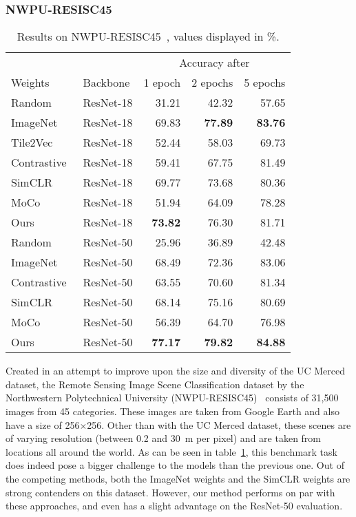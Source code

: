 \documentclass[journal]{IEEEtran}
\begin{document}
\subsubsection{NWPU-RESISC45}
\begin{table}
  \center
  \caption{
    Results on NWPU-RESISC45~\cite{resisc45}, values displayed in \%.
  }\label{table:resisc45}
  \begin{tabular}{llrrr}
    \toprule
    &&\multicolumn{3}{c}{Accuracy after}\\
    Weights&Backbone&1 epoch&2 epochs&5 epochs\\
    \midrule
    Random                        & ResNet-18 & 31.21 & 42.32 & 57.65 \\
    ImageNet                      & ResNet-18 & 69.83 & \textbf{77.89} & \textbf{83.76} \\
    Tile2Vec~\cite{tile2vec}      & ResNet-18 & 52.44 & 58.03 & 69.73 \\
    Contrastive~\cite{simclr}     & ResNet-18 & 59.41 & 67.75 & 81.49 \\
    SimCLR~\cite{simclr}          & ResNet-18 & 69.77 & 73.68 & 80.36 \\
    MoCo~\cite{he_momentum_2020}  & ResNet-18 & 51.94 & 64.09 & 78.28 \\
    Ours                          & ResNet-18 & \textbf{73.82} & 76.30 & 81.71 \\
    \midrule
    Random                        & ResNet-50 & 25.96 & 36.89 & 42.48 \\
    ImageNet                      & ResNet-50 & 68.49 & 72.36 & 83.06 \\
    Contrastive~\cite{simclr}     & ResNet-50 & 63.55 & 70.60 & 81.34 \\
    SimCLR~\cite{simclr}          & ResNet-50 & 68.14 & 75.16 & 80.69 \\
    MoCo~\cite{he_momentum_2020}  & ResNet-50 & 56.39 & 64.70 & 76.98 \\
    Ours                          & ResNet-50 & \textbf{77.17} & \textbf{79.82} & \textbf{84.88} \\
    \bottomrule
  \end{tabular}
\end{table}
 Created in an attempt to improve upon the size and diversity of the UC Merced dataset,
the Remote Sensing Image Scene Classification dataset by the
Northwestern Polytechnical University (NWPU-RESISC45)~\cite{resisc45}
consists of 31,500 images from 45 categories.
These images are taken from Google Earth and also have a size of 256$\times$256.
Other than with the UC Merced dataset,
these scenes are of varying resolution (between 0.2 and \SI{30}{\metre} per pixel)
and are taken from locations all around the world.
As can be seen in table~\ref{table:resisc45},
this benchmark task does indeed pose a bigger challenge to the models
than the previous one.
Out of the competing methods, both the ImageNet weights and
the SimCLR weights are strong contenders on this dataset.
However, our method performs on par with these approaches,
and even has a slight advantage on the ResNet-50 evaluation.
\end{document}
